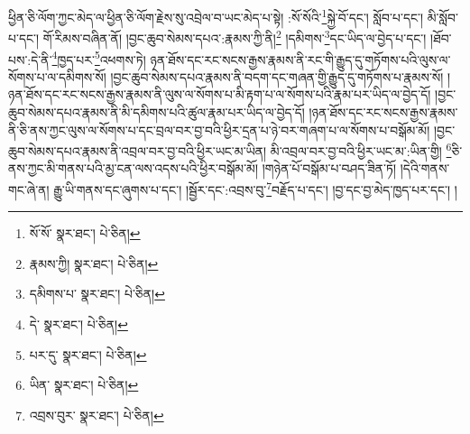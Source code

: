 ཕྱིན་ཅི་ལོག་ཀྱང་མེད་ལ་ཕྱིན་ཅི་ལོག་རྗེས་སུ་འབྲེལ་བ་ཡང་མེད་པ་སྟེ། :སོ་སོའི་\footnote{སོ་སོ་  སྣར་ཐང་།  པེ་ཅིན། }སྐྱེ་བོ་དང་། སློབ་པ་དང་། མི་སློབ་པ་དང་། གོ་རིམས་བཞིན་ནོ། །བྱང་ཆུབ་སེམས་དཔའ་:རྣམས་ཀྱི་ནི།\footnote{རྣམས་ཀྱི།  སྣར་ཐང་།  པེ་ཅིན། } །དམིགས་\footnote{དམིགས་པ་  སྣར་ཐང་།  པེ་ཅིན། }དང་ཡིད་ལ་བྱེད་པ་དང་། །ཐོབ་པས་:དེ་ནི་\footnote{དེ་  སྣར་ཐང་།  པེ་ཅིན། }ཁྱད་པར་\footnote{པར་དུ་  སྣར་ཐང་།  པེ་ཅིན། }འཕགས་ཏེ། ཉན་ཐོས་དང་རང་སངས་རྒྱས་རྣམས་ནི་རང་གི་རྒྱུད་དུ་གཏོགས་པའི་ལུས་ལ་སོགས་པ་ལ་དམིགས་སོ། །བྱང་ཆུབ་སེམས་དཔའ་རྣམས་ནི་བདག་དང་གཞན་གྱི་རྒྱུད་དུ་གཏོགས་པ་རྣམས་སོ། །ཉན་ཐོས་དང་རང་སངས་རྒྱས་རྣམས་ནི་ལུས་ལ་སོགས་པ་མི་རྟག་པ་ལ་སོགས་པའི་རྣམ་པར་ཡིད་ལ་བྱེད་དོ། །བྱང་ཆུབ་སེམས་དཔའ་རྣམས་ནི་མི་དམིགས་པའི་ཚུལ་རྣམ་པར་ཡིད་ལ་བྱེད་དོ། །ཉན་ཐོས་དང་རང་སངས་རྒྱས་རྣམས་ནི་ཅི་ནས་ཀྱང་ལུས་ལ་སོགས་པ་དང་བྲལ་བར་བྱ་བའི་ཕྱིར་དྲན་པ་ཉེ་བར་གཞག་པ་ལ་སོགས་པ་བསྒོམ་མོ། །བྱང་ཆུབ་སེམས་དཔའ་རྣམས་ནི་འབྲལ་བར་བྱ་བའི་ཕྱིར་ཡང་མ་ཡིན། མི་འབྲལ་བར་བྱ་བའི་ཕྱིར་ཡང་མ་:ཡིན་གྱི། \footnote{ཡིན་  སྣར་ཐང་།  པེ་ཅིན། }ཅི་ནས་ཀྱང་མི་གནས་པའི་མྱ་ངན་ལས་འདས་པའི་ཕྱིར་བསྒོམ་མོ། །གཉེན་པོ་བསྒོམ་པ་བཤད་ཟིན་ཏོ། །དེའི་གནས་གང་ཞེ་ན། རྒྱུ་ཡི་གནས་དང་ཞུགས་པ་དང་། །སྦྱོར་དང་:འབྲས་བུ་\footnote{འབྲས་བུར་  སྣར་ཐང་།  པེ་ཅིན། }བརྗོད་པ་དང་། །བྱ་དང་བྱ་མེད་ཁྱད་པར་དང་། །
